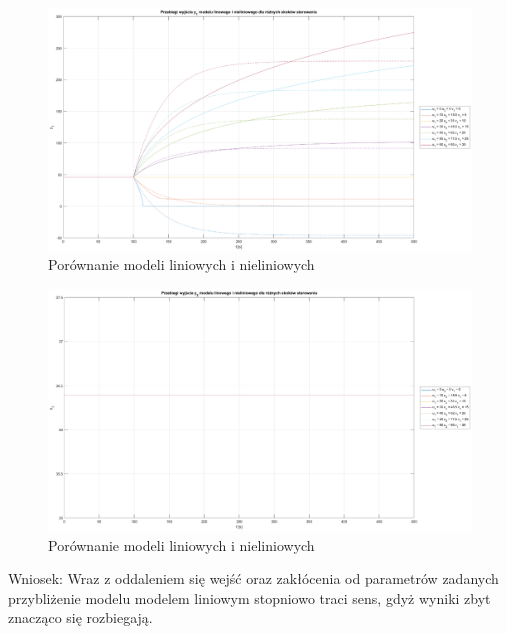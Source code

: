 \begin{figure}[H]
    \centering
    \includegraphics[scale=0.35]{images/y1_u1=60_u2=93_v1=30_dt=0.1.eps}
    \caption{Porównanie modeli liniowych i nieliniowych}
\end{figure}

\begin{figure}[H]
    \centering
    \includegraphics[scale=0.35]{images/y2_u1=60_u2=93_v1=30_dt=0.1.eps}
    \caption{Porównanie modeli liniowych i nieliniowych}
\end{figure}

Wniosek:
Wraz z oddaleniem się wejść oraz zakłócenia od parametrów zadanych przybliżenie modelu modelem liniowym stopniowo traci sens, gdyż wyniki zbyt znacząco się rozbiegają.